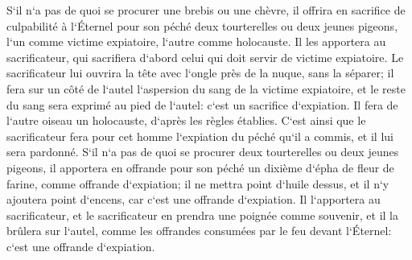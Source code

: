 \verse S`il n`a pas de quoi se procurer une brebis ou une chèvre, il offrira en sacrifice de culpabilité à l`Éternel pour son péché deux tourterelles ou deux jeunes pigeons, l`un comme victime expiatoire, l`autre comme holocauste. 
\verse Il les apportera au sacrificateur, qui sacrifiera d`abord celui qui doit servir de victime expiatoire. Le sacrificateur lui ouvrira la tête avec l`ongle près de la nuque, sans la séparer; 
\verse il fera sur un côté de l`autel l`aspersion du sang de la victime expiatoire, et le reste du sang sera exprimé au pied de l`autel: c`est un sacrifice d`expiation. 
\verse Il fera de l`autre oiseau un holocauste, d`après les règles établies. C`est ainsi que le sacrificateur fera pour cet homme l`expiation du péché qu`il a commis, et il lui sera pardonné. 
\verse S`il n`a pas de quoi se procurer deux tourterelles ou deux jeunes pigeons, il apportera en offrande pour son péché un dixième d`épha de fleur de farine, comme offrande d`expiation; il ne mettra point d`huile dessus, et il n`y ajoutera point d`encens, car c`est une offrande d`expiation. 
\verse Il l`apportera au sacrificateur, et le sacrificateur en prendra une poignée comme souvenir, et il la brûlera sur l`autel, comme les offrandes consumées par le feu devant l`Éternel: c`est une offrande d`expiation. 
